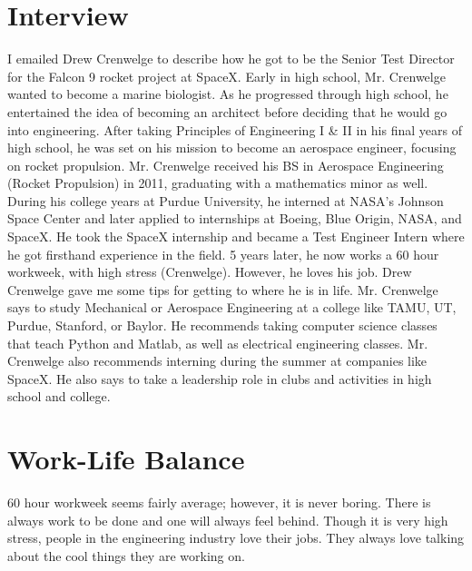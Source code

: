 \section{Interview}
        I emailed Drew Crenwelge to describe how he got to be the Senior Test Director for the Falcon 9 rocket project at SpaceX. Early in high school, Mr. Crenwelge wanted to become a marine biologist. As he progressed through high school, he entertained the idea of becoming an architect before deciding that he would go into engineering. After taking Principles of Engineering I \& II in his final years of high school, he was set on his mission to become an aerospace engineer, focusing on rocket propulsion. Mr. Crenwelge received his BS in Aerospace Engineering (Rocket Propulsion) in 2011, graduating with a mathematics minor as well. During his college years at Purdue University, he interned at NASA’s Johnson Space Center and later applied to internships at Boeing, Blue Origin, NASA, and SpaceX. He took the SpaceX internship and became a Test Engineer Intern where he got firsthand experience in the field. 5 years later, he now works a 60 hour workweek, with high stress (Crenwelge). However, he loves his job. 
        Drew Crenwelge gave me some tips for getting to where he is in life. Mr. Crenwelge says to study Mechanical or Aerospace Engineering at a college like TAMU, UT, Purdue, Stanford, or Baylor. He recommends taking computer science classes that teach Python and Matlab, as well as electrical engineering classes. Mr. Crenwelge also recommends interning during the summer at companies like SpaceX. He also says to take a leadership role in clubs and activities in high school and college. 
\section{Work-Life Balance}
    60 hour workweek seems fairly average; however, it is never boring. There is always work to be done and one will always feel behind. 
    Though it is very high stress, people in the engineering industry love their jobs. They always love talking about the cool things they are working on.
